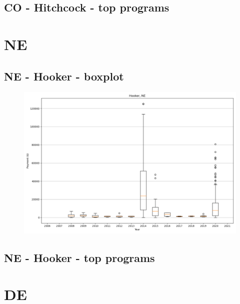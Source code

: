 \subsection*{CO - Hitchcock - top programs}

\newpage
\section*{NE}
\subsection*{NE - Hooker - boxplot}
\begin{figure}[h]
\centering
\includegraphics[width=7in]{../output/boxplots/counties/Hooker-NE_boxplot.png}
\end{figure}


\subsection*{NE - Hooker - top programs}

\newpage
\section*{DE}
